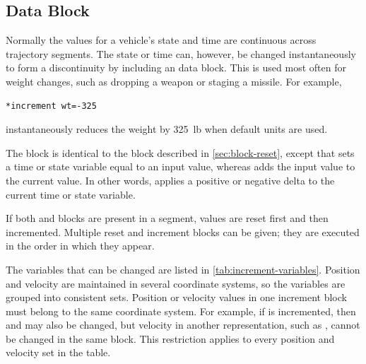 \subsection{ Data Block}\label{sec:block-increment}

Normally the values for a vehicle's state and time are continuous across trajectory
segments. The state or time can, however, be changed instantaneously to form a
discontinuity by including an  data block. This is used
most often for weight changes, such as dropping a weapon or staging a missile. For
example,

\begin{lstlisting}[style=taosmanual]
*increment wt=-325
\end{lstlisting}

instantaneously reduces the weight by 325~lb when default units are used.

The  block is identical to the
 block described in \cref{sec:block-reset}, except that
 sets a time or state variable equal to an input value,
whereas  adds the input value to the current value. In
other words,  applies a positive or negative delta to
the current time or state variable.

If both  and  blocks are
present in a segment, values are reset first and then incremented. Multiple reset and
increment blocks can be given; they are executed in the order in which they appear.

The variables that can be changed are listed in \cref{tab:increment-variables}.
Position and velocity are maintained in several coordinate systems, so the variables
are grouped into consistent sets. Position or velocity values in one increment block
must belong to the same coordinate system. For example, if
 is incremented, then  and
 may also be changed, but velocity in another representation,
such as , cannot be changed in the same block. This restriction
applies to every position and velocity set in the table.

